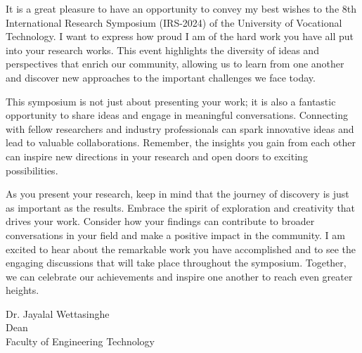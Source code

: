 \thispagestyle{fancy}
	




   
    



		It is a great pleasure to have an opportunity to convey my best wishes to the 8th International Research Symposium (IRS-2024) of the University of Vocational Technology. I want to express how proud I am of the hard work you have all put into your research works. This event highlights the diversity of ideas and perspectives that enrich our community, allowing us to learn from one another and discover new approaches to the important challenges we face today.
        
This symposium is not just about presenting your work; it is also a fantastic opportunity to share ideas and engage in meaningful conversations. Connecting with fellow researchers and industry professionals can spark innovative ideas and lead to valuable collaborations. Remember, the insights you gain from each other can inspire new directions in your research and open doors to exciting possibilities.

As you present your research, keep in mind that the journey of discovery is just as important as the results. Embrace the spirit of exploration and creativity that drives your work. Consider how your findings can contribute to broader conversations in your field and make a positive impact in the community. I am excited to hear about the remarkable work you have accomplished and to see the engaging discussions that will take place throughout the symposium. Together, we can celebrate our achievements and inspire one another to reach even greater heights.

	\vspace{1cm}
	\noindent
	Dr. Jayalal Wettasinghe\\
Dean\\
Faculty of Engineering Technology
	
	\newpage